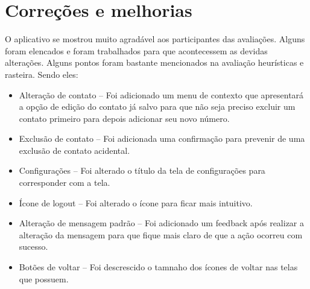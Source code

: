 \section{Correções e melhorias}
O aplicativo se mostrou muito agradável aos participantes das avaliações. Alguns foram elencados e foram trabalhados para que acontecessem as devidas alterações. Alguns pontos foram bastante mencionados na avaliação heurísticas e rasteira. Sendo eles: 
\begin{itemize}
\item Alteração de contato – Foi adicionado um menu de contexto que apresentará a opção de edição do contato já salvo para que não seja preciso excluir um contato primeiro para depois adicionar seu novo número.
\item Exclusão de contato – Foi adicionada uma confirmação para prevenir de uma exclusão de contato acidental.
\item Configurações – Foi alterado o título da tela de configurações para corresponder com a tela.
\item Ícone de logout – Foi alterado o ícone para ficar mais intuitivo. 
\item Alteração de mensagem padrão – Foi adicionado um feedback após realizar a alteração da mensagem para que fique mais claro de que a ação ocorreu com sucesso.
\item Botões de voltar – Foi descrescido o tamnaho dos ícones de voltar nas telas que possuem.
\end{itemize}
 
